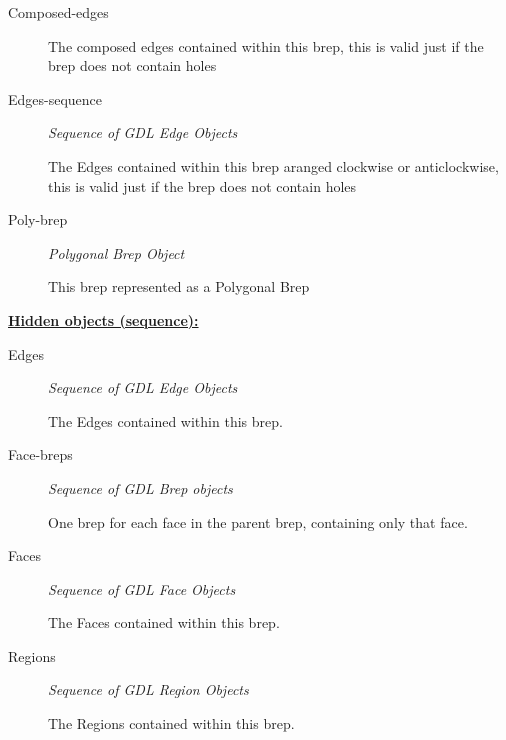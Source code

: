 \documentclass [11pt]{book}
\begin{document}
\begin{itemize}
\begin{description}

\item [Composed-edges]

The composed edges contained within this brep, this is valid just if the brep does not contain holes




\item [Edges-sequence]
\emph{Sequence of GDL Edge Objects}

 The Edges contained within this brep aranged clockwise or anticlockwise,
this is valid just if the brep does not contain holes




\item [Poly-brep]
\emph{Polygonal Brep Object}

 This brep represented as a Polygonal Brep




\end{description}






\textbf{
\underline{Hidden objects (sequence):}}

\begin{description}

\item [Edges]
\emph{Sequence of GDL Edge Objects}

 The Edges contained within this brep.




\item [Face-breps]
\emph{Sequence of GDL Brep objects}

 One brep for each face in the parent brep, containing only that face.




\item [Faces]
\emph{Sequence of GDL Face Objects}

 The Faces contained within this brep.




\item [Regions]
\emph{Sequence of GDL Region Objects}

 The Regions contained within this brep.





\end{description}
\end{itemize}
\end{document}
